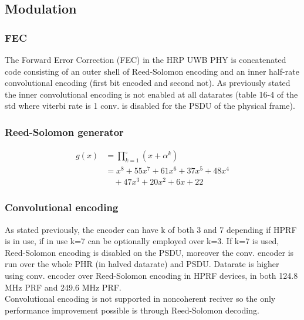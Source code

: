 \documentclass[conference]{IEEEtran}
\begin{document}
\subsection{Modulation}
\subsubsection{FEC}
The Forward Error Correction (FEC) in the HRP UWB PHY is concatenated code consisting of an
outer shell of Reed-Solomon encoding and an inner half-rate convolutional encoding (first bit
encoded and second not). As previously stated the inner convolutional encoding is not enabled
at all datarates (table 16-4 of the std where viterbi rate is 1 conv. is disabled for the PSDU
of the physical frame).\\

\subsubsection{Reed-Solomon generator}
\begin{align*}
  g(x) &= \prod_{k=1}^{\circ} (x + \alpha^k) \\
       &= x^8 + 55x^7 + 61x^6 + 37x^5 + 48x^4 \\
       &\quad + 47x^3 + 20x^2 + 6x + 22
  \end{align*}

\subsubsection{Convolutional encoding}
As stated previously, the encoder can have k of both 3 and 7 depending if HPRF is in use,
if in use k=7 can be optionally employed over k=3. If k=7 is used, Reed-Solomon encoding
is disabled on the PSDU, moreover the conv. encoder is run over the whole PHR (in halved datarate) 
and PSDU. Datarate is higher using conv. encoder over Reed-Solomon encoding in HPRF devices, in
both  124.8 MHz PRF and 249.6 MHz PRF.\\ 
Convolutional encoding is not supported in noncoherent reciver so the only performance
improvement possible is through Reed-Solomon decoding.\\
\end{document}
